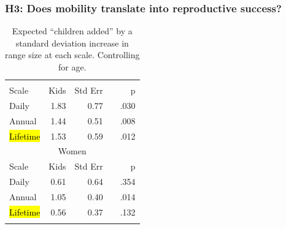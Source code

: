 \documentclass{beamer}
\makeatletter
\newcommand\SoulColor{%
  \let\set@color\beamerorig@set@color
  \let\reset@color\beamerorig@reset@color}
\makeatother
\begin{document}

\begin{frame}
\frametitle{H3: Does mobility translate into reproductive success?}
\begin{table}
\begin{tabular}{lrrrr}
\hline\noalign{\smallskip}
\multicolumn{5}{c}{Men} \\
Scale & Kids & Std Err && p \\
Daily & 1.83 & 0.77 && .030\\
Annual & 1.44 & 0.51 && .008\\
\SoulColor\hl{Lifetime} & 1.53 & 0.59 && .012\\
\multicolumn{5}{c}{Women} \\
Scale & Kids & Std Err && p \\
Daily & 0.61 & 0.64 && .354 \\
Annual & 1.05 & 0.40 && .014 \\
\SoulColor\hl{Lifetime} & 0.56 & 0.37 && .132 \\
\noalign{\smallskip}\hline
\end{tabular}\par
\caption{\small{Expected ``children added'' by a standard deviation increase in range size at each scale. Controlling for age.}}
\end{table}		  

\end{frame}








\end{document}
